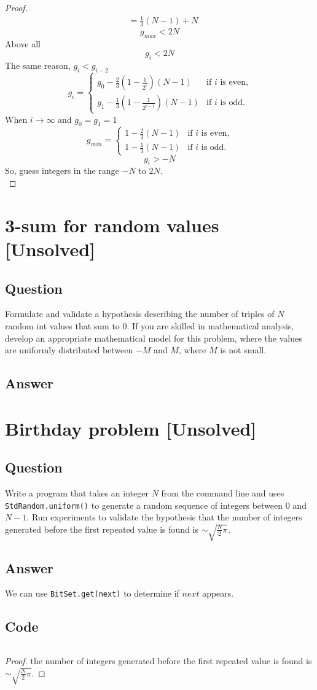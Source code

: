 \documentclass[12pt]{article}
\numberwithin{equation}{section}
\begin{document}
\begin{proof}
\begin{align*}
    &=\frac{1}{3}(N-1)+N
    \end{align*}
    \[g_{max}<2N\]
    Above all
    \[g_i<2N\]
    The same reason, $g_i<g_{i-2}$
    \[g_i=
    \begin{cases}
        g_0-\frac{2}{3}(1-\frac{1}{2^i})(N-1) & \text{if $i$ is even,}\\
        g_1-\frac{1}{3}(1-\frac{1}{2^{i-1}})(N-1) & \text{if $i$ is odd.}
    \end{cases}\]
    When $i \to \infty$ and $g_0=g_1=1$
    \[g_{min}=
    \begin{cases}
        1-\frac{2}{3}(N-1) & \text{if $i$ is even,}\\
        1-\frac{1}{3}(N-1) & \text{if $i$ is odd.}
    \end{cases}\]
    \[g_{i}>-N\]
    So, guess integers in the range $-N$ to $2N$.\\
\end{proof}

\newpage
\section{3-sum for random values [Unsolved]}
\subsection*{Question}
Formulate and validate a hypothesis describing the
number of triples of $N$ random int values that sum to 0.
If you are skilled in mathematical analysis, develop an
appropriate mathematical model for this problem, where
the values are uniformly distributed between $-M$ and $M$,
where $M$ is not small.
\subsection*{Answer}

\newpage
\section{Birthday problem [Unsolved]}
\subsection*{Question}
Write a program that takes an integer $N$ from the command
line and uses \texttt{StdRandom.uniform()} to generate a random sequence of integers
between 0 and $N-1$. Run experiments to validate the hypothesis that the number of
integers generated before the first repeated value is found is $\sim$$\sqrt{\frac{N}{2}\pi}$.
\subsection*{Answer}
We can use \texttt{BitSet.get(next)} to determine if $next$ appears.
\subsection*{Code}
\inputminted{java}{BirthdayProblem.java}
\begin{proof}
    the number of integers generated before the first repeated
    value is found is $\sim$$\sqrt{\frac{N}{2}\pi}$.
\end{proof}
\end{document}
